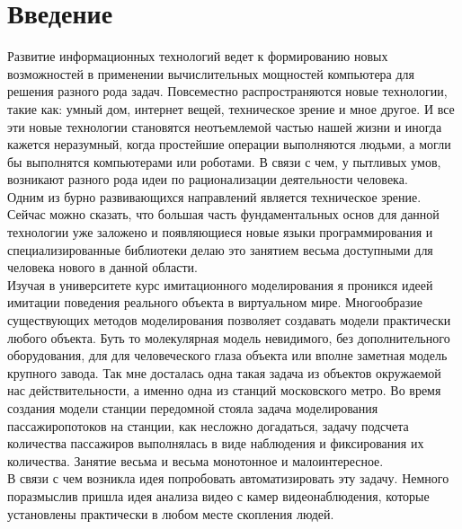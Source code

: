 \documentclass[12pt]{article}
\begin{document}
\fontsize{14}{16pt}\selectfont


	\begin{titlepage}
	
	\end{titlepage}

	
	\tableofcontents %
	\newpage
	
	
	\part*{\centering Введение}
Развитие информационных технологий ведет к формированию новых возможностей в применении вычислительных мощностей компьютера для решения разного  рода задач. Повсеместно распространяются новые технологии, такие как: умный дом, интернет вещей, техническое зрение и мное другое. И все эти новые технологии становятся неотъемлемой частью нашей жизни и иногда кажется неразумный, когда простейшие операции выполняются людьми, а могли бы выполнятся компьютерами или роботами. В связи с чем, у пытливых умов, возникают разного рода идеи по рационализации деятельности человека.
\\  \indent Одним из бурно развивающихся направлений является техническое зрение. Сейчас можно сказать, что большая часть фундаментальных основ для данной технологии уже заложено и появляющиеся новые языки программирования и специализированные библиотеки делаю это занятием весьма доступными для человека нового в данной области. 
\\  \indent  Изучая в университете курс имитационного моделирования я проникся идеей имитации поведения реального объекта в виртуальном мире. Многообразие существующих методов моделирования позволяет создавать модели практически любого объекта. Буть то молекулярная модель невидимого, без дополнительного оборудования,  для для человеческого глаза объекта или вполне заметная модель крупного завода. Так мне досталась одна такая задача из объектов окружаемой нас действительности,  а именно одна из станций московского метро. Во время создания модели станции передомной стояла задача моделирования пассажиропотоков на станции, как несложно догадаться, задачу подсчета количества пассажиров выполнялась в виде наблюдения и фиксирования их количества. Занятие весьма и весьма монотонное и малоинтересное. 
\\  \indent В связи с чем возникла идея попробовать автоматизировать эту задачу. Немного поразмыслив пришла идея анализа видео с камер видеонаблюдения, которые установлены практически в любом месте скопления людей. 
\end{document}
